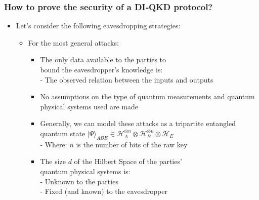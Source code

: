 \documentclass{beamer}
\begin{document}
		\begin{frame}
			\frametitle{\large How to prove the security of a DI‑QKD protocol?}

            \vspace{3ex}
            \begin{itemize}
                \item Let's consider the following eavesdropping strategies:
                \begin{itemize}
                    \item For the most general attacks:
                    \begin{itemize}
                        \item The only data available to the parties to\\ bound the eavesdropper's knowledge is:\\
                        - The observed relation between the inputs and outputs
                        \item No assumptions on the type of quantum measurements and quantum physical systems used are made
                        \vspace{2ex}
                        \item Generally, we can model these attacks as a tripartite entangled quantum state ${|\Psi\rangle}_{ABE} \in {\mathcal{H}}_{A}^{\otimes n} \otimes {\mathcal{H}}_{B}^{\otimes n} \otimes {\mathcal{H}}_{E}$\\
                        \vspace{0.75ex}
                        - Where: $n$ is the number of bits of the raw key
                        \vspace{2ex}
                        \item The size $d$ of the Hilbert Space of the parties'\\ quantum physical systems is:\\
                        - Unknown to the parties\\
                        - Fixed (and known) to the eavesdropper
                    \end{itemize}
                \end{itemize}
            \end{itemize}
		\end{frame}
\end{document}
